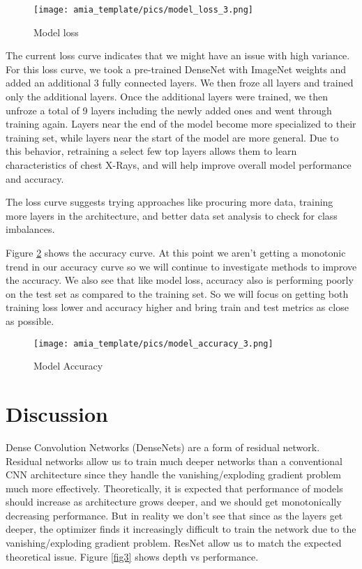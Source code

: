 \documentclass{amia}
\begin{document}
\begin{figure}[h!]
\centering
\texttt{[image: amia\_template/pics/model\_loss\_3.png]}
\caption{Model loss}
\label{fig1}
\end{figure}

The current loss curve indicates that we might have an issue with high variance. For this loss curve, we took a pre-trained DenseNet with ImageNet weights and added an additional 3 fully connected layers. We then froze all layers and trained only the additional layers. Once the additional layers were trained, we then unfroze a total of 9 layers including the newly added ones and went through training again. Layers near the end of the model become more specialized to their training set, while layers near the start of the model are more general. Due to this behavior, retraining a select few top layers allows them to learn characteristics of chest X-Rays, and will help improve overall model performance and accuracy.

The loss curve suggests trying approaches like procuring more data, training more layers in the architecture, and better data set analysis to check for class imbalances.

Figure \ref{fig2} shows the accuracy curve. At this point we aren't getting a monotonic trend in our accuracy curve so we will continue to investigate methods to improve the accuracy. We also see that like model loss, accuracy also is performing poorly on the test set as compared to the training set. So we will focus on getting both training loss lower and accuracy higher and bring train and test metrics as close as possible.

\begin{figure}[h!]
\centering
\texttt{[image: amia\_template/pics/model\_accuracy\_3.png]}
\caption{Model Accuracy}
\label{fig2}
\end{figure}


\section*{Discussion}
Dense Convolution Networks (DenseNets) are a form of residual network. Residual networks allow us to train much deeper networks than a conventional CNN architecture since they handle the vanishing/exploding gradient problem much more effectively. Theoretically, it is expected that performance of models should increase as architecture grows deeper, and we should get monotonically decreasing performance. But in reality we don't see that since as the layers get deeper, the optimizer finds it increasingly difficult to train the network due to the vanishing/exploding gradient problem. ResNet allow us to match the expected theoretical issue. Figure \ref{fig3} shows depth vs performance.
\end{document}
